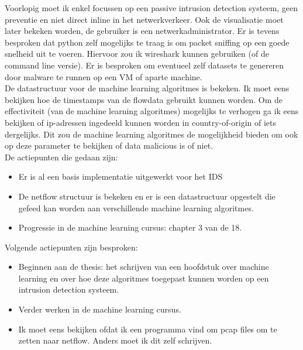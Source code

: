 \noindent Voorlopig moet ik enkel focussen op een passive intrusion detection systeem, geen preventie en niet direct inline in het netwerkverkeer. Ook de visualisatie moet later bekeken worden, de gebruiker is een netwerkadministrator. Er is tevens besproken dat python zelf mogelijks te traag is om packet sniffing op een goede snelheid uit te voeren. Hiervoor zou ik wireshark kunnen gebruiken (of de command line versie). Er is besproken om eventueel zelf datasets te genereren door malware te runnen op een VM of aparte machine.\\

\noindent De datastructuur voor de machine learning algoritmes is bekeken. Ik moet eens bekijken hoe de timestamps van de flowdata gebruikt kunnen worden. Om de effectiviteit (van de machine learning algoritmes) mogelijks te verhogen ga ik eens bekijken of ip-adressen ingedeeld kunnen worden in country-of-origin of iets dergelijks. Dit zou de machine learning algoritmes de mogelijkheid bieden om ook op deze parameter te bekijken of data malicious is of niet.\\

\noindent De actiepunten die gedaan zijn:
\begin{itemize}  
		\item Er is al een basis implementatie uitgewerkt voor het IDS
        \item De netflow structuur is bekeken en er is een datastructuur opgestelt die gefeed kan worden aan verschillende machine learning algoritmes.
        \item Progressie in de machine learning cursus: chapter 3 van de 18.
\end{itemize}

\noindent Volgende actiepunten zijn besproken:
\begin{itemize}  
        \item Beginnen aan de thesis: het schrijven van een hoofdstuk over machine learning en over hoe deze algoritmes toegepast kunnen worden op een intrusion detection systeem.
        \item Verder werken in de machine learning cursus.
        \item Ik moet eens bekijken ofdat ik een programma vind om pcap files om te zetten naar netflow. Anders moet ik dit zelf schrijven.
\end{itemize}

